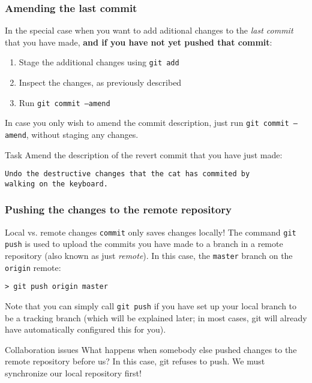 
\begin{frame}[fragile]

\frametitle{Amending the last commit}

In the special case when you want to add aditional changes to the \textit{last commit} that you have made, \textbf{and if you have not yet pushed that commit}:

	\begin{enumerate}
	\item Stage the additional changes using \texttt{git add}
	\item Inspect the changes, as previously described
	\item Run \texttt{git commit --amend}
	\end{enumerate}

In case you only wish to amend the commit description, just run \texttt{git commit --amend}, without staging any changes.

	\begin{block}{Task}
	Amend the description of the revert commit that you have just made:
	\begin{verbatim}
Undo the destructive changes that the cat has commited by
walking on the keyboard.
	\end{verbatim}
\end{block}

\end{frame}


\begin{frame}[fragile]
	\frametitle{Pushing the changes to the remote repository}
	
	\begin{block}{Local vs. remote changes}
	\texttt{commit} only saves changes \alert{locally}! The command \texttt{git push} is used to upload the commits you have made to a branch in a remote repository (also known as just \textit{remote}). In this case, the \texttt{master} branch on the \texttt{origin} remote:
	
	\begin{verbatim}
> git push origin master
	\end{verbatim}
	\end{block}

Note that you can simply call \texttt{git push} if you have set up your local branch to be a tracking branch (which will be explained later; in most cases, git will already have automatically configured this for you).

	\begin{block}{Collaboration issues}
What happens when somebody else pushed changes to the remote repository before us? In this case, git refuses to push. We must synchronize our local repository first!
	\end{block}	
	
\end{frame}

